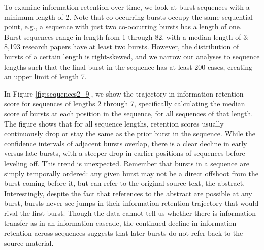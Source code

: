\documentclass[letterpaper]{article} %
\begin{document}
To examine information retention over time, we look at burst sequences with a minimum length of 2. Note that co-occurring bursts occupy the same sequential point, e.g., a sequence with just two co-occurring bursts has a length of one. Burst sequences range in length from 1 through 82, with a median length of 3; 8,193 research papers have at least two bursts. However, the distribution of bursts of a certain length is right-skewed, and we narrow our analyses to sequence lengths such that the final burst in the sequence has at least 200 cases, creating an upper limit of length 7.

In Figure \ref{fig:sequences2_9}, we show the trajectory in information retention score for sequences of lengths 2 through 7, specifically calculating the median score of bursts at each position in the sequence, for all sequences of that length. The figure shows that for all sequence lengths, retention scores usually continuously drop or stay the same as the prior burst in the sequence. While the confidence intervals of adjacent bursts overlap, there is a clear decline in early versus late bursts, with a steeper drop in earlier positions of sequences before leveling off. %
This trend is unexpected. Remember that bursts in a sequence are simply temporally ordered: any given burst may not be a direct offshoot from the burst coming before it, but can refer to the original source text, the abstract. Interestingly, despite the fact that references to the abstract are possible at any burst, bursts never see jumps in their information retention trajectory that would rival the first burst. Though the data cannot tell us whether there is information transfer as in an information cascade, the continued decline in information retention across sequences suggests that later bursts do not refer back to the source material.
\end{document}
